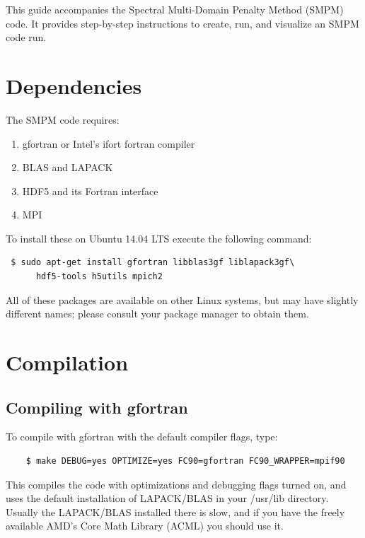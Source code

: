 \documentclass[onside]{article}
\begin{document}
\maketitle

This guide accompanies the Spectral Multi-Domain Penalty Method (SMPM) code.  It provides step-by-step instructions to create, run, and visualize an SMPM code run.

\section{Dependencies}

The SMPM code requires:
\begin{enumerate}
	\item gfortran or Intel's ifort fortran compiler
	\item BLAS and LAPACK
	\item HDF5 and its Fortran interface
	\item MPI
\end{enumerate}

To install these on Ubuntu 14.04 LTS execute the following command: 

	 \begin{verbatim} $ sudo apt-get install gfortran libblas3gf liblapack3gf\
	  hdf5-tools h5utils mpich2 \end{verbatim}

All of these packages are available on other Linux systems, but may have slightly different names; please consult your package manager to obtain them.

\section{Compilation}
\label{compile}

\subsection{Compiling with gfortran}

To compile with gfortran with the default compiler flags, type:

\begin{verbatim}
	$ make DEBUG=yes OPTIMIZE=yes FC90=gfortran FC90_WRAPPER=mpif90
\end{verbatim}

This compiles the code with optimizations and debugging flags turned on, and uses the default installation of LAPACK/BLAS in your /usr/lib directory.  Usually the LAPACK/BLAS installed there is slow, and if you have the freely available AMD's Core Math Library (ACML) you should use it.  
\end{document}
